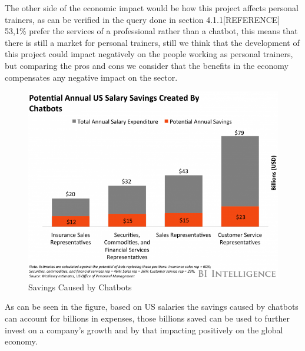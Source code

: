 The other side of the economic impact would be how this project affects personal trainers, as can be verified in the query done in section 4.1.1[REFERENCE] 53,1\% prefer the services of a professional rather than a chatbot, this means that there is still a market for personal trainers, still we think that the development of this project could impact negatively on the people working as personal trainers, but comparing the pros and cons we consider that the benefits in the economy compensates any negative impact on the sector.


\begin{center}
	\begin{figure}[h!]
		\centering
		\includegraphics[scale=0.7]{./images/6-chat-sav}
		\caption{Savings Caused by Chatbots}
		\label{6_chat_sav}
	\end{figure}
\end{center}

As can be seen in the figure, based on US salaries the savings caused by chatbots can account for billions in expenses, those billions saved can be used to further invest on a company’s growth and by that impacting positively on the global economy.